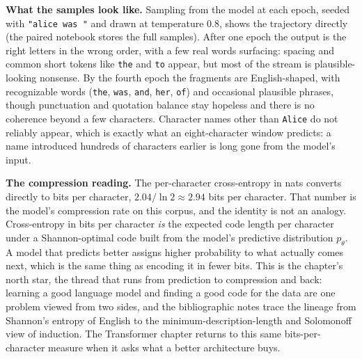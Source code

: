 \textbf{What the samples look like.} Sampling from the model at each epoch,
seeded with \texttt{"alice was "} and drawn at temperature $0.8$, shows the
trajectory directly (the paired notebook stores the full samples). After
one epoch the output is the right letters in the wrong order, with a few
real words surfacing: spacing and common short tokens like \texttt{the} and
\texttt{to} appear, but most of the stream is plausible-looking nonsense.
By the fourth epoch the fragments are English-shaped, with recognizable
words (\texttt{the}, \texttt{was}, \texttt{and}, \texttt{her}, \texttt{of})
and occasional plausible phrases, though punctuation and quotation balance
stay hopeless and there is no coherence beyond a few characters. Character
names other than \texttt{Alice} do not reliably appear, which is exactly
what an eight-character window predicts: a name introduced hundreds of
characters earlier is long gone from the model's input.

\textbf{The compression reading.} The per-character cross-entropy in nats
converts directly to bits per character, $2.04 / \ln 2 \approx 2.94$ bits
per character. That number is the model's compression rate on this corpus,
and the identity is not an analogy. Cross-entropy in bits per character
\emph{is} the expected code length per character under a Shannon-optimal
code built from the model's predictive distribution $p_\theta$. A model
that predicts better assigns higher probability to what actually comes
next, which is the same thing as encoding it in fewer bits. This is the
chapter's north star, the thread that runs from prediction to compression
and back: learning a good language model and finding a good code for the
data are one problem viewed from two sides, and the bibliographic notes
trace the lineage from Shannon's entropy of English to the
minimum-description-length and Solomonoff view of induction. The
Transformer chapter returns to this same bits-per-character measure when it
asks what a better architecture buys.
